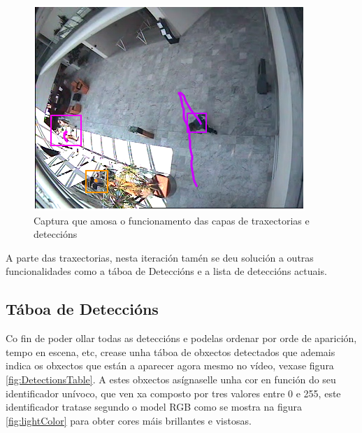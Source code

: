    \begin{figure}[htp]
    \begin{center}
        \includegraphics[scale=0.6]{figures/trajCapture.png}
        \caption{Captura que amosa o funcionamento das capas de traxectorias e deteccións}
    \label{fig:trajCapture}
    \end{center}
    \end{figure}
    
    A parte das traxectorias, nesta iteración tamén se deu solución a outras funcionalidades como
    a táboa de Deteccións e a lista de deteccións actuais.

    \subsection{Táboa de Deteccións}

        Co fin de poder ollar todas as deteccións e podelas ordenar por orde de aparición, tempo en 
        escena, etc, crease unha táboa de obxectos detectados que ademais indica os obxectos que están
        a aparecer agora mesmo no vídeo, vexase figura \ref{fig:DetectionsTable}.
        A estes obxectos asígnaselle unha cor en función do seu 
        identificador unívoco, que ven xa composto por tres valores entre 0 e 255, este identificador
        tratase segundo o model RGB como se mostra na figura \ref{fig:lightColor} para obter cores
        máis brillantes e vistosas.
        
